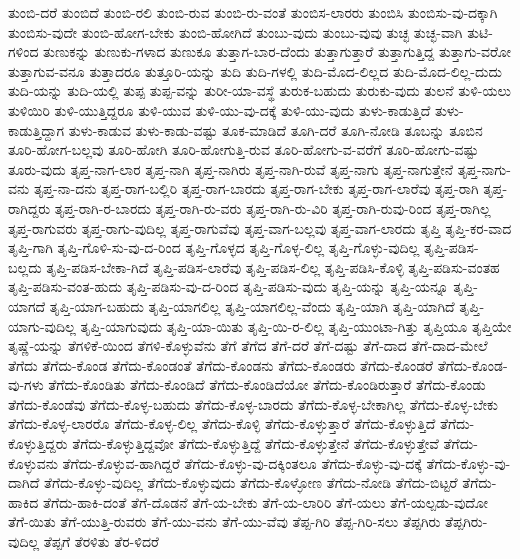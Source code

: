 {ತುಂಬಿ-ದರೆ
ತುಂಬಿದೆ
ತುಂಬಿ-ರಲಿ
ತುಂಬಿ-ರುವ
ತುಂಬಿ-ರು-ವಂತೆ
ತುಂಬಿಸ-ಲಾರರು
ತುಂಬಿಸಿ
ತುಂಬಿಸು-ವು-ದಕ್ಕಾಗಿ
ತುಂಬಿಸು-ವುದೇ
ತುಂಬಿ-ಹೋಗ-ಬೇಕು
ತುಂಬಿ-ಹೋಗಿದೆ
ತುಂಬು-ವುದು
ತುಂಬು-ವುವು
ತುಚ್ಛ
ತುಚ್ಛ-ವಾಗಿ
ತುಟಿ-ಗಳಿಂದ
ತುಣುಕನ್ನು
ತುಣುಕು-ಗಳಾದ
ತುಣುಕೂ
ತುತ್ತಾಗ-ಬಾರ-ದೆಂದು
ತುತ್ತಾಗುತ್ತಾರೆ
ತುತ್ತಾಗುತ್ತಿದ್ದ
ತುತ್ತಾಗು-ವರೋ
ತುತ್ತಾಗುವ-ವನೂ
ತುತ್ತಾದರೂ
ತುತ್ತೂರಿ-ಯನ್ನು
ತುದಿ
ತುದಿ-ಗಳಲ್ಲಿ
ತುದಿ-ಮೊದ-ಲಿಲ್ಲದ
ತುದಿ-ಮೊದ-ಲಿಲ್ಲ-ದುದು
ತುದಿ-ಯನ್ನು
ತುದಿ-ಯಲ್ಲಿ
ತುಪ್ಪ
ತುಪ್ಪ-ವನ್ನು
ತುರೀ-ಯಾ-ವಸ್ಥೆ
ತುರುಕ-ಬಹುದು
ತುರುಕು-ವುದು
ತುಲನೆ
ತುಳಿ-ಯಲು
ತುಳಿಯಿರಿ
ತುಳಿ-ಯುತ್ತಿದ್ದರೂ
ತುಳಿ-ಯುವ
ತುಳಿ-ಯು-ವು-ದಕ್ಕೆ
ತುಳಿ-ಯು-ವುದು
ತುಳು-ಕಾಡುತ್ತಿದೆ
ತುಳು-ಕಾಡುತ್ತಿದ್ದಾಗ
ತುಳು-ಕಾಡುವ
ತುಳು-ಕಾಡು-ವಷ್ಟು
ತೂಕ-ಮಾಡಿದೆ
ತೂಗಿ-ದರೆ
ತೂಗಿ-ನೋಡಿ
ತೂಬನ್ನು
ತೂಬಿನ
ತೂರಿ-ಹೋಗ-ಬಲ್ಲವು
ತೂರಿ-ಹೋಗಿ
ತೂರಿ-ಹೋಗುತ್ತಿ-ರುವ
ತೂರಿ-ಹೋಗು-ವ-ವರೆಗೆ
ತೂರಿ-ಹೋಗು-ವಷ್ಟು
ತೂರು-ವುದು
ತೃಪ್ತ-ನಾಗ-ಲಾರ
ತೃಪ್ತ-ನಾಗಿ
ತೃಪ್ತ-ನಾಗಿರು
ತೃಪ್ತ-ನಾಗಿ-ರುವೆ
ತೃಪ್ತ-ನಾಗು
ತೃಪ್ತ-ನಾಗುತ್ತೇನೆ
ತೃಪ್ತ-ನಾಗು-ವನು
ತೃಪ್ತ-ನಾ-ದನು
ತೃಪ್ತ-ರಾಗ-ಬಲ್ಲಿರಿ
ತೃಪ್ತ-ರಾಗ-ಬಾರದು
ತೃಪ್ತ-ರಾಗ-ಬೇಕು
ತೃಪ್ತ-ರಾಗ-ಲಾರೆವು
ತೃಪ್ತ-ರಾಗಿ
ತೃಪ್ತ-ರಾಗಿದ್ದರು
ತೃಪ್ತ-ರಾಗಿ-ರ-ಬಾರದು
ತೃಪ್ತ-ರಾಗಿ-ರು-ವರು
ತೃಪ್ತ-ರಾಗಿ-ರು-ವಿರಿ
ತೃಪ್ತ-ರಾಗಿ-ರುವು-ರಿಂದ
ತೃಪ್ತ-ರಾಗಿಲ್ಲ
ತೃಪ್ತ-ರಾಗುವರು
ತೃಪ್ತ-ರಾಗು-ವುದಿಲ್ಲ
ತೃಪ್ತ-ರಾಗುವೆವು
ತೃಪ್ತ-ವಾಗ-ಬಲ್ಲವು
ತೃಪ್ತ-ವಾಗ-ಲಾರದು
ತೃಪ್ತಿ
ತೃಪ್ತಿ-ಕರ-ವಾದ
ತೃಪ್ತಿ-ಗಾಗಿ
ತೃಪ್ತಿ-ಗೊಳಿ-ಸು-ವು-ದ-ರಿಂದ
ತೃಪ್ತಿ-ಗೊಳ್ಳದ
ತೃಪ್ತಿ-ಗೊಳ್ಳ-ಲಿಲ್ಲ
ತೃಪ್ತಿ-ಗೊಳ್ಳು-ವುದಿಲ್ಲ
ತೃಪ್ತಿ-ಪಡಿಸ-ಬಲ್ಲದು
ತೃಪ್ತಿ-ಪಡಿಸ-ಬೇಕಾ-ಗಿದೆ
ತೃಪ್ತಿ-ಪಡಿಸ-ಲಾರೆವು
ತೃಪ್ತಿ-ಪಡಿಸ-ಲಿಲ್ಲ
ತೃಪ್ತಿ-ಪಡಿಸಿ-ಕೊಳ್ಳಿ
ತೃಪ್ತಿ-ಪಡಿಸು-ವಂತಹ
ತೃಪ್ತಿ-ಪಡಿಸು-ವಂತ-ಹುದು
ತೃಪ್ತಿ-ಪಡಿಸು-ವು-ದ-ರಿಂದ
ತೃಪ್ತಿ-ಪಡಿಸು-ವುದು
ತೃಪ್ತಿ-ಯನ್ನು
ತೃಪ್ತಿ-ಯನ್ನೂ
ತೃಪ್ತಿ-ಯಾಗದೆ
ತೃಪ್ತಿ-ಯಾಗ-ಬಹುದು
ತೃಪ್ತಿ-ಯಾಗಲಿಲ್ಲ
ತೃಪ್ತಿ-ಯಾಗಲಿಲ್ಲ-ವೆಂದು
ತೃಪ್ತಿ-ಯಾಗಿ
ತೃಪ್ತಿ-ಯಾಗಿದೆ
ತೃಪ್ತಿ-ಯಾಗು-ವುದಿಲ್ಲ
ತೃಪ್ತಿ-ಯಾಗುವುದು
ತೃಪ್ತಿ-ಯಾ-ಯಿತು
ತೃಪ್ತಿ-ಯಿ-ರ-ಲಿಲ್ಲ
ತೃಪ್ತಿ-ಯುಂಟಾ-ಗಿತ್ತು
ತೃಪ್ತಿಯೂ
ತೃಪ್ತಿಯೇ
ತೃಷ್ಣೆ-ಯನ್ನು
ತೆಗಳಿಕೆ-ಯಿಂದ
ತೆಗಳಿ-ಕೊಳ್ಳುವೆನು
ತೆಗೆ
ತೆಗೆದ
ತೆಗೆ-ದರೆ
ತೆಗೆ-ದಷ್ಟು
ತೆಗೆ-ದಾದ
ತೆಗೆ-ದಾದ-ಮೇಲೆ
ತೆಗೆದು
ತೆಗೆದು-ಕೊಂಡ
ತೆಗೆದು-ಕೊಂಡಂತೆ
ತೆಗೆದು-ಕೊಂಡನು
ತೆಗೆದು-ಕೊಂಡರು
ತೆಗೆದು-ಕೊಂಡರೆ
ತೆಗೆದು-ಕೊಂಡ-ವು-ಗಳು
ತೆಗೆದು-ಕೊಂಡಿತು
ತೆಗೆದು-ಕೊಂಡಿದೆ
ತೆಗೆದು-ಕೊಂಡಿದೆಯೋ
ತೆಗೆದು-ಕೊಂಡಿರುತ್ತಾರೆ
ತೆಗೆದು-ಕೊಂಡು
ತೆಗೆದು-ಕೊಂಡೆವು
ತೆಗೆದು-ಕೊಳ್ಳ-ಬಹುದು
ತೆಗೆದು-ಕೊಳ್ಳ-ಬಾರದು
ತೆಗೆದು-ಕೊಳ್ಳ-ಬೇಕಾಗಿಲ್ಲ
ತೆಗೆದು-ಕೊಳ್ಳ-ಬೇಕು
ತೆಗೆದು-ಕೊಳ್ಳ-ಲಾರರೊ
ತೆಗೆದು-ಕೊಳ್ಳ-ಲಿಲ್ಲ
ತೆಗೆದು-ಕೊಳ್ಳಿ
ತೆಗೆದು-ಕೊಳ್ಳುತ್ತಾರೆ
ತೆಗೆದು-ಕೊಳ್ಳುತ್ತಿದೆ
ತೆಗೆದು-ಕೊಳ್ಳುತ್ತಿದ್ದರು
ತೆಗೆದು-ಕೊಳ್ಳುತ್ತಿದ್ದವೋ
ತೆಗೆದು-ಕೊಳ್ಳುತ್ತಿದ್ದೆ
ತೆಗೆದು-ಕೊಳ್ಳುತ್ತೇನೆ
ತೆಗೆದು-ಕೊಳ್ಳುತ್ತೇವೆ
ತೆಗೆದು-ಕೊಳ್ಳುವನು
ತೆಗೆದು-ಕೊಳ್ಳುವ-ಹಾಗಿದ್ದರೆ
ತೆಗೆದು-ಕೊಳ್ಳು-ವು-ದಕ್ಕಿಂತಲೂ
ತೆಗೆದು-ಕೊಳ್ಳು-ವು-ದಕ್ಕೆ
ತೆಗೆದು-ಕೊಳ್ಳು-ವು-ದಾಗಿದೆ
ತೆಗೆದು-ಕೊಳ್ಳು-ವುದಿಲ್ಲ
ತೆಗೆದು-ಕೊಳ್ಳುವುದು
ತೆಗೆದು-ಕೊಳ್ಳೋಣ
ತೆಗೆದು-ನೋಡಿ
ತೆಗೆದು-ಬಿಟ್ಟರೆ
ತೆಗೆದು-ಹಾಕಿದ
ತೆಗೆದು-ಹಾಕಿ-ದಂತೆ
ತೆಗೆ-ದೊಡನೆ
ತೆಗೆ-ಯ-ಬೇಕು
ತೆಗೆ-ಯ-ಲಾರಿರಿ
ತೆಗೆ-ಯಲು
ತೆಗೆ-ಯಲ್ಪಡು-ವುದೋ
ತೆಗೆ-ಯಿತು
ತೆಗೆ-ಯುತ್ತಿ-ರುವರು
ತೆಗೆ-ಯು-ವನು
ತೆಗೆ-ಯು-ವೆವು
ತೆಪ್ಪ-ಗಿರಿ
ತೆಪ್ಪ-ಗಿರಿ-ಸಲು
ತೆಪ್ಪಗಿರು
ತೆಪ್ಪಗಿರು-ವುದಿಲ್ಲ
ತೆಪ್ಪಗೆ
ತೆರಳಿತು
ತೆರ-ಳಿದರೆ
}
